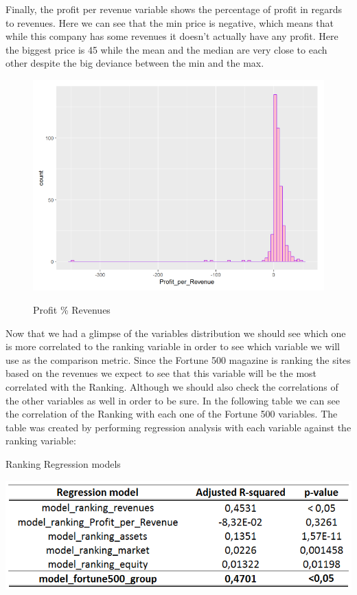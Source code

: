 \documentclass{book}
\begin{document}
Finally, the profit per revenue variable shows the percentage of profit in regards to revenues. Here we can see that the min price is negative, which means that while this company has some revenues it doesn't actually have any profit. Here the biggest price is 45 while the mean and the median are very close to each other despite the big deviance between the min and the max.\\
\begin{figure}[H]
\centering
\caption{Profit \% Revenues}
\begin{center}
\includegraphics[scale=0.35]{../R/photos/4_2_ppp.png}  \\
\end{center}
\end{figure}
Now that we had a glimpse of the variables distribution we should see which one is more correlated to the ranking variable in order to see which variable we will use as the comparison metric. Since the Fortune 500 magazine is ranking the sites based on the revenues we expect to see that this variable will be the most correlated with the Ranking. Although we should also check the correlations of the other variables as well in order to be sure. In the following table we can see the correlation of the Ranking with each one of the Fortune 500 variables. The table was created by performing regression analysis with each variable against the ranking variable:
\begin{table}[H]
\centering
\caption{Ranking Regression models}
\begin{center}
\includegraphics[scale=0.5]{../R/photos/4_2_reg_mod.png}  \\
\end{center}
\end{table}
\end{document}
